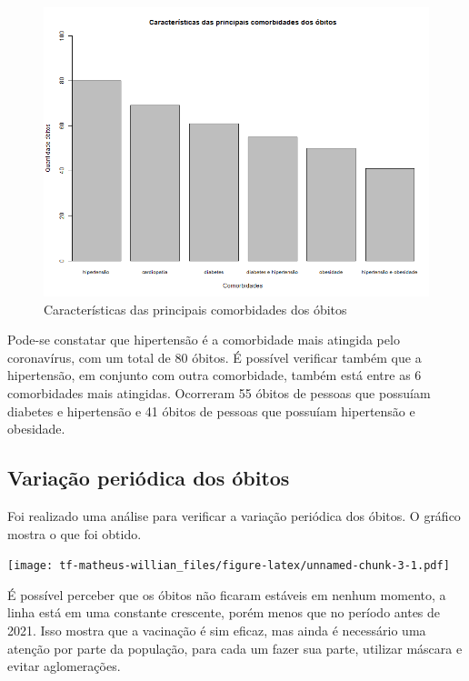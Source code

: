 \documentclass[
  brazilian,
]{article}
\begin{document}
\begin{figure}
\centering
\includegraphics{../graficos/caracteristicas_principais_comorbidades_obitos.png}
\caption{Características das principais comorbidades dos óbitos}
\end{figure}

Pode-se constatar que hipertensão é a comorbidade mais atingida pelo
coronavírus, com um total de 80 óbitos. É possível verificar também que
a hipertensão, em conjunto com outra comorbidade, também está entre as 6
comorbidades mais atingidas. Ocorreram 55 óbitos de pessoas que possuíam
diabetes e hipertensão e 41 óbitos de pessoas que possuíam hipertensão e
obesidade.

\hypertarget{variauxe7uxe3o-periuxf3dica-dos-uxf3bitos}{%
\subsection{Variação periódica dos
óbitos}\label{variauxe7uxe3o-periuxf3dica-dos-uxf3bitos}}

Foi realizado uma análise para verificar a variação periódica dos
óbitos. O gráfico mostra o que foi obtido.

\texttt{[image: tf-matheus-willian\_files/figure-latex/unnamed-chunk-3-1.pdf]}

É possível perceber que os óbitos não ficaram estáveis em nenhum
momento, a linha está em uma constante crescente, porém menos que no
período antes de 2021. Isso mostra que a vacinação é sim eficaz, mas
ainda é necessário uma atenção por parte da população, para cada um
fazer sua parte, utilizar máscara e evitar aglomerações.
\end{document}
